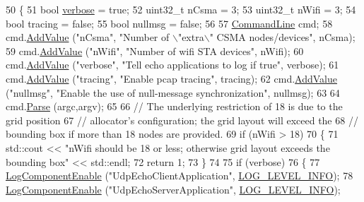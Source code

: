 \begin{DoxyCode}
50 \{
51   \textcolor{keywordtype}{bool} \hyperlink{openflow-switch_8cc_ab3f078684998b83967d507d0f453f454}{verbose} = \textcolor{keyword}{true};
52   uint32\_t nCsma = 3;
53   uint32\_t nWifi = 3;
54   \textcolor{keywordtype}{bool} tracing = \textcolor{keyword}{false};
55   \textcolor{keywordtype}{bool} nullmsg = \textcolor{keyword}{false};
56 
57   \hyperlink{classns3_1_1CommandLine}{CommandLine} cmd;
58   cmd.\hyperlink{classns3_1_1CommandLine_addcfb546c7ad4c8bd0965654d55beb8e}{AddValue} (\textcolor{stringliteral}{"nCsma"}, \textcolor{stringliteral}{"Number of \(\backslash\)"extra\(\backslash\)" CSMA nodes/devices"}, nCsma);
59   cmd.\hyperlink{classns3_1_1CommandLine_addcfb546c7ad4c8bd0965654d55beb8e}{AddValue} (\textcolor{stringliteral}{"nWifi"}, \textcolor{stringliteral}{"Number of wifi STA devices"}, nWifi);
60   cmd.\hyperlink{classns3_1_1CommandLine_addcfb546c7ad4c8bd0965654d55beb8e}{AddValue} (\textcolor{stringliteral}{"verbose"}, \textcolor{stringliteral}{"Tell echo applications to log if true"}, verbose);
61   cmd.\hyperlink{classns3_1_1CommandLine_addcfb546c7ad4c8bd0965654d55beb8e}{AddValue} (\textcolor{stringliteral}{"tracing"}, \textcolor{stringliteral}{"Enable pcap tracing"}, tracing);
62   cmd.\hyperlink{classns3_1_1CommandLine_addcfb546c7ad4c8bd0965654d55beb8e}{AddValue} (\textcolor{stringliteral}{"nullmsg"}, \textcolor{stringliteral}{"Enable the use of null-message synchronization"}, nullmsg);
63 
64   cmd.\hyperlink{classns3_1_1CommandLine_a5c10b85b3207e5ecb48d907966923156}{Parse} (argc,argv);
65 
66   \textcolor{comment}{// The underlying restriction of 18 is due to the grid position}
67   \textcolor{comment}{// allocator's configuration; the grid layout will exceed the}
68   \textcolor{comment}{// bounding box if more than 18 nodes are provided.}
69   \textcolor{keywordflow}{if} (nWifi > 18)
70     \{
71       std::cout << \textcolor{stringliteral}{"nWifi should be 18 or less; otherwise grid layout exceeds the bounding box"} << 
      std::endl;
72       \textcolor{keywordflow}{return} 1;
73     \}
74 
75   \textcolor{keywordflow}{if} (verbose)
76     \{
77       \hyperlink{namespacens3_adc4ef4f00bb2f5f4edae67fc3bc27f20}{LogComponentEnable} (\textcolor{stringliteral}{"UdpEchoClientApplication"}, 
      \hyperlink{namespacens3_aa6464a4d69551a9cc968e17a65f39bdbae36aedc880de94fd5a5b53bb9fe65628}{LOG\_LEVEL\_INFO});
78       \hyperlink{namespacens3_adc4ef4f00bb2f5f4edae67fc3bc27f20}{LogComponentEnable} (\textcolor{stringliteral}{"UdpEchoServerApplication"}, 
      \hyperlink{namespacens3_aa6464a4d69551a9cc968e17a65f39bdbae36aedc880de94fd5a5b53bb9fe65628}{LOG\_LEVEL\_INFO});

\end{DoxyCode}
